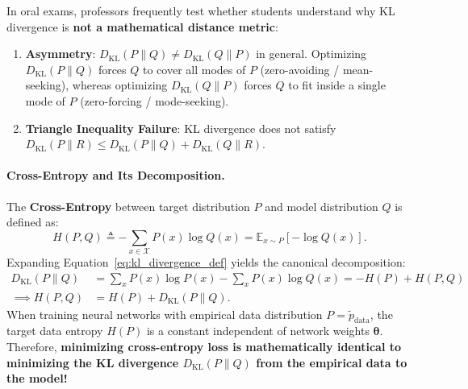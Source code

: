 \begin{examinsight}
In oral exams, professors frequently test whether students understand why KL divergence is \textbf{not a mathematical distance metric}:
\begin{enumerate}[noitemsep]
  \item \textbf{Asymmetry}: $D_{\text{KL}}(P \parallel Q) \ne D_{\text{KL}}(Q \parallel P)$ in general. Optimizing $D_{\text{KL}}(P \parallel Q)$ forces $Q$ to cover all modes of $P$ (zero-avoiding / mean-seeking), whereas optimizing $D_{\text{KL}}(Q \parallel P)$ forces $Q$ to fit inside a single mode of $P$ (zero-forcing / mode-seeking).
  \item \textbf{Triangle Inequality Failure}: KL divergence does not satisfy $D_{\text{KL}}(P \parallel R) \le D_{\text{KL}}(P \parallel Q) + D_{\text{KL}}(Q \parallel R)$.
\end{enumerate}
\end{examinsight}

\paragraph{Cross-Entropy and Its Decomposition.}
The \textbf{Cross-Entropy} between target distribution $P$ and model distribution $Q$ is defined as:
\begin{equation}
H(P, Q) \triangleq -\sum_{x \in \mathcal{X}} P(x) \log Q(x) = \mathbb{E}_{x \sim P}[-\log Q(x)].
\label{eq:cross_entropy_def_infotheory}
\end{equation}
Expanding Equation~\eqref{eq:kl_divergence_def} yields the canonical decomposition:
\begin{align}
D_{\text{KL}}(P \parallel Q) &= \sum_{x} P(x) \log P(x) - \sum_{x} P(x) \log Q(x) = -H(P) + H(P, Q) \nonumber \\
\implies H(P, Q) &= H(P) + D_{\text{KL}}(P \parallel Q).
\label{eq:cross_entropy_kl_decomposition}
\end{align}
When training neural networks with empirical data distribution $P = \tilde{p}_{\text{data}}$, the target data entropy $H(P)$ is a constant independent of network weights $\boldsymbol{\theta}$. Therefore, \textbf{minimizing cross-entropy loss is mathematically identical to minimizing the KL divergence $D_{\text{KL}}(P \parallel Q)$ from the empirical data to the model!}

